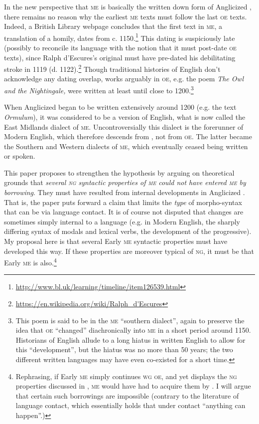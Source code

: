 \documentclass[output=paper]{LSP/langsci}
\begin{document}
In the new perspective that \textsc{me} is basically the written down form of Anglicized , there remains no reason why the earliest \textsc{me} texts must follow the last \textsc{oe} texts. Indeed, a British Library webpage concludes that the first text in \textsc{me}, a translation of a  homily, dates from c. 1150.\footnote{\url{http://www.bl.uk/learning/timeline/item126539.html}} This dating is suspiciously late (possibly to reconcile its language with the notion that it must post-date \textsc{oe} texts), since Ralph d’Escures’s original must have pre-dated his debilitating stroke in 1119 (d. 1122).\footnote{\url{https://en.wikipedia.org/wiki/Ralph_d'Escures}} Though traditional histories of English don’t acknowledge any dating overlap, works arguably in \textsc{oe}, e.g. the poem \textit{The Owl and the Nightingale,} were written at least until close to 1200.\footnote{This poem is said to be in the \textsc{me} ``southern dialect'', again to preserve the idea that \textsc{oe} ``changed'' diachronically into \textsc{me} in a short period around 1150. Historians of English allude to a long hiatus in written English to allow for this ``development'', but the hiatus was no more than 50 years; the two different written languages may have even co-existed for a short time.} 

When Anglicized  began to be written extensively around 1200 (e.g. the text \textit{Ormulum}), it was considered to be a version of English, what is now called the East Midlands dialect of \textsc{me}. Uncontroversially this dialect is the forerunner of Modern English, which therefore descends from , not from \textsc{oe}. The latter became the Southern and Western dialects of \textsc{me}, which eventually ceased being written or spoken. 

  This paper proposes to strengthen the hypothesis  by arguing on theoretical grounds that \textit{several \textsc{ng} syntactic properties of \textsc{me} could not have entered \textsc{me} by borrowing}. They must have resulted from internal developments in Anglicized . That is, the paper puts forward a claim that limits the \textit{type} of morpho-syntax that can be  via language contact. It is of course not disputed that changes are sometimes simply internal to a language (e.g. in Modern English, the sharply differing syntax of modals and lexical verbs, the development of the progressive). My proposal here is that several Early \textsc{me} syntactic properties must have developed this way. If these properties are moreover typical of \textsc{ng}, it must be that Early \textsc{me} is also.\footnote{Rephrasing, if Early \textsc{me} simply continues \textsc{wg} \textsc{oe}, and yet displays the \textsc{ng} properties discussed in , \textsc{me} would have had to acquire them by . I will argue that certain such borrowings are impossible (contrary to the literature of language contact, which essentially holds that under contact ``anything can happen''.)}
\end{document}

